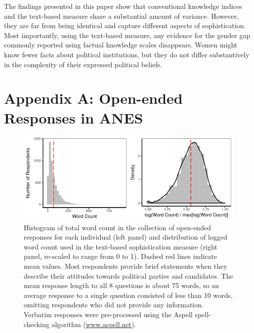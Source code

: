 \documentclass[12pt]{article}
\begin{document}
The findings presented in this paper show that conventional knowledge indices and the text-based measure share a substantial amount of variance. However, they are far from being identical and capture different aspects of sophistication. Most importantly, using the text-based measure, any evidence for the gender gap commonly reported using factual knowledge scales disappears. Women might know fewer facts about political institutions, but they do not differ substantively in the complexity of their expressed political beliefs.


\singlespacing



\section*{Appendix A: Open-ended Responses in ANES}
\renewcommand\thefigure{A.\arabic{figure}}
\renewcommand\thetable{A.\arabic{table}}
\setcounter{figure}{0}
\setcounter{table}{0}



\begin{figure}[h]\centering
\includegraphics{../fig/wc.pdf}
\caption{Histogram of total word count in the collection of open-ended responses for each individual (left panel) and distribution of logged word count used in the text-based sophistication measure (right panel, re-scaled to range from 0 to 1). Dashed red lines indicate mean values. Most respondents provide brief statements when they describe their attitudes towards political parties and candidates. The mean response length to all 8 questions is about 75 words, so an average response to a single question consisted of less than 10 words, omitting respondents who did not provide any information. Verbatim responses were pre-processed using the Aspell spell-checking algorithm (\url{www.aspell.net}).}\label{fig:wc}
\end{figure}
\end{document}
